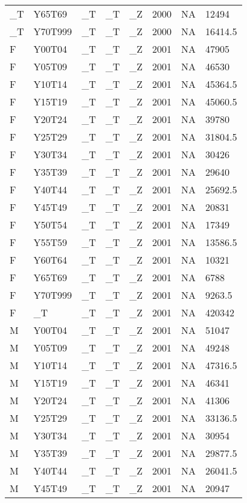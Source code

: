 \begin{longtable}[t]{llllllll}
\addlinespace
\_T & Y65T69 & \_T & \_T & \_Z & 2000 & NA & 12494\\
\_T & Y70T999 & \_T & \_T & \_Z & 2000 & NA & 16414.5\\
F & Y00T04 & \_T & \_T & \_Z & 2001 & NA & 47905\\
F & Y05T09 & \_T & \_T & \_Z & 2001 & NA & 46530\\
F & Y10T14 & \_T & \_T & \_Z & 2001 & NA & 45364.5\\
\addlinespace
F & Y15T19 & \_T & \_T & \_Z & 2001 & NA & 45060.5\\
F & Y20T24 & \_T & \_T & \_Z & 2001 & NA & 39780\\
F & Y25T29 & \_T & \_T & \_Z & 2001 & NA & 31804.5\\
F & Y30T34 & \_T & \_T & \_Z & 2001 & NA & 30426\\
F & Y35T39 & \_T & \_T & \_Z & 2001 & NA & 29640\\
\addlinespace
F & Y40T44 & \_T & \_T & \_Z & 2001 & NA & 25692.5\\
F & Y45T49 & \_T & \_T & \_Z & 2001 & NA & 20831\\
F & Y50T54 & \_T & \_T & \_Z & 2001 & NA & 17349\\
F & Y55T59 & \_T & \_T & \_Z & 2001 & NA & 13586.5\\
F & Y60T64 & \_T & \_T & \_Z & 2001 & NA & 10321\\
\addlinespace
F & Y65T69 & \_T & \_T & \_Z & 2001 & NA & 6788\\
F & Y70T999 & \_T & \_T & \_Z & 2001 & NA & 9263.5\\
F & \_T & \_T & \_T & \_Z & 2001 & NA & 420342\\
M & Y00T04 & \_T & \_T & \_Z & 2001 & NA & 51047\\
M & Y05T09 & \_T & \_T & \_Z & 2001 & NA & 49248\\
\addlinespace
M & Y10T14 & \_T & \_T & \_Z & 2001 & NA & 47316.5\\
M & Y15T19 & \_T & \_T & \_Z & 2001 & NA & 46341\\
M & Y20T24 & \_T & \_T & \_Z & 2001 & NA & 41306\\
M & Y25T29 & \_T & \_T & \_Z & 2001 & NA & 33136.5\\
M & Y30T34 & \_T & \_T & \_Z & 2001 & NA & 30954\\
\addlinespace
M & Y35T39 & \_T & \_T & \_Z & 2001 & NA & 29877.5\\
M & Y40T44 & \_T & \_T & \_Z & 2001 & NA & 26041.5\\
M & Y45T49 & \_T & \_T & \_Z & 2001 & NA & 20947\\

\end{longtable}
